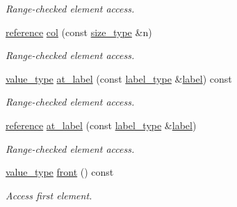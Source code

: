 \begin{DoxyCompactItemize}
\begin{DoxyCompactList}\small\item\em Range-\/checked element access. \end{DoxyCompactList}\item 
\hyperlink{classIceBRG_1_1labeled__array__row__reference_a24c2694c9ca46757f21f7024a229c925}{reference} \hyperlink{classIceBRG_1_1labeled__array__row__reference_afd8adae270f4df67924de96ccc5beaa0}{col} (const \hyperlink{classIceBRG_1_1labeled__array__row__reference_a80c5d11ebfa639fa27894ce288633df0}{size\+\_\+type} \&n)
\begin{DoxyCompactList}\small\item\em Range-\/checked element access. \end{DoxyCompactList}\item 
\hyperlink{classIceBRG_1_1labeled__array__row__reference_ae6cfe4bdcb3bc59c3d7613193633f063}{value\+\_\+type} \hyperlink{classIceBRG_1_1labeled__array__row__reference_a91c3c3f275b448e443bc27f72b494216}{at\+\_\+label} (const \hyperlink{classIceBRG_1_1labeled__array__row__reference_a0b7e29867009277fee9102863be2d63a}{label\+\_\+type} \&\hyperlink{classIceBRG_1_1labeled__array__row__reference_a1280fd88579bdf943ac18d547b8805de}{label}) const 
\begin{DoxyCompactList}\small\item\em Range-\/checked element access. \end{DoxyCompactList}\item 
\hyperlink{classIceBRG_1_1labeled__array__row__reference_a24c2694c9ca46757f21f7024a229c925}{reference} \hyperlink{classIceBRG_1_1labeled__array__row__reference_addae59ee5af7d76586bd6695f6a2a171}{at\+\_\+label} (const \hyperlink{classIceBRG_1_1labeled__array__row__reference_a0b7e29867009277fee9102863be2d63a}{label\+\_\+type} \&\hyperlink{classIceBRG_1_1labeled__array__row__reference_a1280fd88579bdf943ac18d547b8805de}{label})
\begin{DoxyCompactList}\small\item\em Range-\/checked element access. \end{DoxyCompactList}\item 
\hyperlink{classIceBRG_1_1labeled__array__row__reference_ae6cfe4bdcb3bc59c3d7613193633f063}{value\+\_\+type} \hyperlink{classIceBRG_1_1labeled__array__row__reference_aa7a42a670dab9f96920066c653421cbd}{front} () const 
\begin{DoxyCompactList}\small\item\em Access first element. \end{DoxyCompactList}\item 

\end{DoxyCompactItemize}
